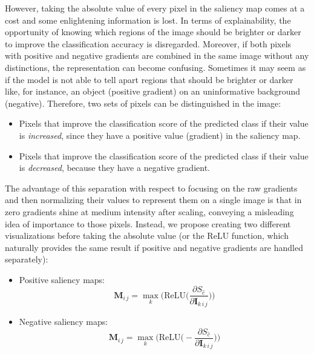 \documentclass[preprint,12pt]{elsarticle}
\begin{document}
However, taking the absolute value of every pixel in the saliency map comes at a cost and some enlightening information is lost. In terms of explainability, the opportunity of knowing which regions of the image should be brighter or darker to improve the classification accuracy is disregarded. Moreover, if both pixels with positive and negative gradients are combined in the same image without any distinctions, the representation can become confusing. Sometimes it may seem as if the model is not able to tell apart regions that should be brighter or darker like, for instance, an object (positive gradient) on an uninformative background (negative). Therefore, two sets of pixels can be distinguished in the image:

\begin{itemize}
    \item Pixels that improve the classification score of the predicted class if their value is \emph{increased}, since they have a positive value (gradient) in the saliency map.
    \item Pixels that improve the classification score of the predicted class if their value is \emph{decreased}, because they have a negative gradient.
\end{itemize}

The advantage of this separation with respect to focusing on the raw gradients and then normalizing their values to represent them on a single image is that in~\cite{Smilkov2017} zero gradients shine at medium intensity after scaling, conveying a misleading idea of importance to those pixels. Instead, we propose creating two different visualizations before taking the absolute value (or the ReLU function, which naturally provides the same result if positive and negative gradients are handled separately):

\begin{itemize}
    \item Positive saliency maps:
    \begin{equation}
        \boldsymbol{M}_{i\, j} = \max_{k} \bigg ( \text{ReLU} \bigg (\frac{\partial S_{\hat{c}}}{\partial \boldsymbol{I}_{k\, i\, j}} \bigg ) \bigg )
        \label{eq: positive saliency map}
    \end{equation}

    \item Negative saliency maps:
    \begin{equation}
      \boldsymbol{M}_{i\, j} = \max_{k} \bigg ( \text{ReLU} \bigg ( - \frac{\partial S_{\hat{c}}}{\partial \boldsymbol{I}_{k\, i\, j}} \bigg ) \bigg )
      \label{eq: negative saliency map}
  \end{equation}
\end{itemize}
\end{document}
